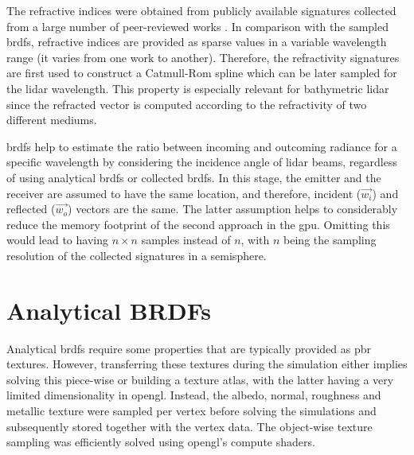 The refractive indices were obtained from publicly available signatures collected from a large number of peer-reviewed works \cite{mikhail_n_polyanskiy_refractive_nodate}. In comparison with the sampled \acrshort{brdf}s, refractive indices are provided as sparse values in a variable wavelength range (it varies from one work to another). Therefore, the refractivity signatures are first used to construct a Catmull-Rom spline which can be later sampled for the \acrshort{lidar} wavelength. This property is especially relevant for bathymetric \acrshort{lidar} since the refracted vector is computed according to the refractivity of two different mediums.

\acrshort{brdf}s help to estimate the ratio between incoming and outcoming radiance for a specific wavelength by considering the incidence angle of \acrshort{lidar} beams, regardless of using analytical \acrshort{brdf}s or collected \acrshort{brdf}s. In this stage, the emitter and the receiver are assumed to have the same location, and therefore, incident ($\vec{w_{i}}$) and reflected ($\vec{w_{o}}$) vectors are the same. The latter assumption helps to considerably reduce the memory footprint of the second approach in the \acrshort{gpu}. Omitting this would lead to having $n \times n$ samples instead of $n$, with $n$ being the sampling resolution of the collected signatures in a semisphere. 

\section{Analytical BRDFs}

Analytical \acrshort{brdf}s require some properties that are typically provided as \acrshort{pbr} textures. However, transferring these textures during the simulation either implies solving this piece-wise or building a texture atlas, with the latter having a very limited dimensionality in \acrshort{opengl}. Instead, the albedo, normal, roughness and metallic texture were sampled per vertex before solving the simulations and subsequently stored together with the vertex data. The object-wise texture sampling was efficiently solved using \acrshort{opengl}'s compute shaders.

